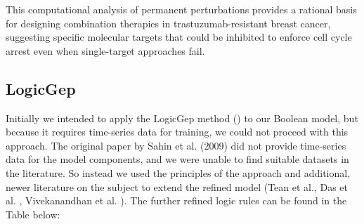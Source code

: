 \documentclass[a4paper,12pt]{article}
\begin{document}
This computational analysis of permanent perturbations provides a rational basis for designing combination therapies in trastuzumab-resistant breast cancer, suggesting specific molecular targets that could be inhibited to enforce cell cycle arrest even when single-target approaches fail.

\subsection{LogicGep}

Initially we intended to apply the LogicGep method (\cite{Zhang2024}) to our Boolean model, but because it requires time-series data for training, we could not proceed with this approach. The original paper by Sahin et al. (2009) did not provide time-series data for the model components, and we were unable to find suitable datasets in the literature.  
So instead we used the principles of the approach and additional, newer literature on the subject to extend the refined model (Tean et al.\cite{Tian2009}, Das et al. \cite{Das2025}, Vivekanandhan et al. \cite{Vivekanandhan2022}). The further refined logic rules can be found in the Table below:
\end{document}
